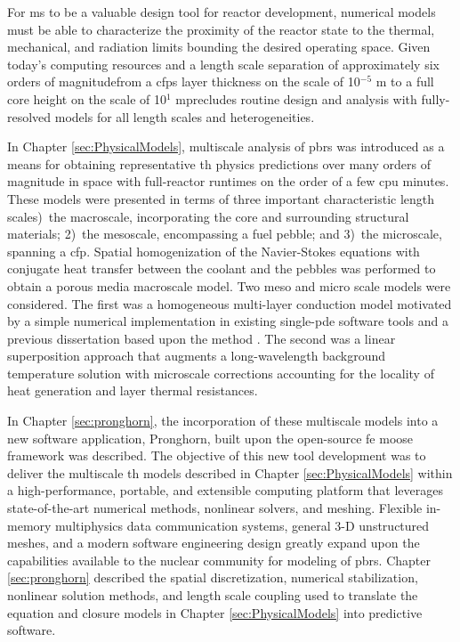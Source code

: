For \gls{ms} to be a valuable design tool for reactor development, numerical models must be able to characterize the proximity of the reactor state to the thermal, mechanical, and radiation limits bounding the desired operating space. Given today's computing resources and a length scale separation of approximately six orders of magnitude\mdash from a \glspl{cfp} layer thickness on the scale of 10$^{-5}$ \si{\meter} to a full core height on the scale of 10$^1$ \si{\meter}\mdash precludes routine design and analysis with fully-resolved models for all length scales and heterogeneities.

In Chapter \ref{sec:PhysicalModels}, multiscale analysis of \glspl{pbr} was introduced as a means for obtaining representative \gls{th} physics predictions over many orders of magnitude in space with full-reactor runtimes on the order of a few \gls{cpu} minutes. These models were presented in terms of three important characteristic length scales)~the macroscale, incorporating the core and surrounding structural materials; 2)~the mesoscale, encompassing a fuel pebble; and 3)~the microscale, spanning a \gls{cfp}. Spatial homogenization of the Navier-Stokes equations with conjugate heat transfer between the coolant and the pebbles was performed to obtain a porous media macroscale model. Two meso and micro scale models were considered. The first was a homogeneous multi-layer conduction model motivated by a simple numerical implementation in existing single-\gls{pde} software tools and a previous dissertation based upon the method \cite{xin_wang_thesis}. The second was a linear superposition approach that augments a long-wavelength background temperature solution with microscale corrections accounting for the locality of heat generation and layer thermal resistances. 

In Chapter \ref{sec:pronghorn}, the incorporation of these multiscale models into a new software application, Pronghorn, built upon the open-source \gls{fe} \gls{moose} framework was described. The objective of this new tool development was to deliver the multiscale \gls{th} models described in Chapter \ref{sec:PhysicalModels} within a high-performance, portable, and extensible computing platform that leverages state-of-the-art numerical methods, nonlinear solvers, and meshing. Flexible in-memory multiphysics data communication systems, general 3-D unstructured meshes, and a modern software engineering design greatly expand upon the capabilities available to the nuclear community for modeling of \glspl{pbr}. Chapter \ref{sec:pronghorn} described the spatial discretization, numerical stabilization, nonlinear solution methods, and length scale coupling used to translate the equation and closure models in Chapter \ref{sec:PhysicalModels} into predictive software.

